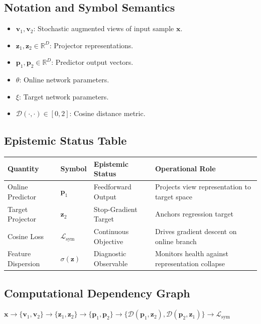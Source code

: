 \documentclass[11pt,a4paper]{article}
\theoremstyle{definition}
\begin{document}
\subsection{Notation and Symbol Semantics}
\begin{itemize}
    \item $\mathbf{v}_1, \mathbf{v}_2$: Stochastic augmented views of input sample $\mathbf{x}$.
    \item $\mathbf{z}_1, \mathbf{z}_2 \in \mathbb{R}^D$: Projector representations.
    \item $\mathbf{p}_1, \mathbf{p}_2 \in \mathbb{R}^D$: Predictor output vectors.
    \item $\theta$: Online network parameters.
    \item $\xi$: Target network parameters.
    \item $\mathcal{D}(\cdot, \cdot) \in [0, 2]$: Cosine distance metric.
\end{itemize}

\subsection{Epistemic Status Table}
\begin{table}[h]
\centering
\small
\begin{tabular}{@{}llll@{}}
\toprule
\textbf{Quantity} & \textbf{Symbol} & \textbf{Epistemic Status} & \textbf{Operational Role} \\
\midrule
Online Predictor & $\mathbf{p}_1$ & Feedforward Output & Projects view representation to target space \\
Target Projector & $\mathbf{z}_2$ & Stop-Gradient Target & Anchors regression target \\
Cosine Loss & $\mathcal{L}_{\text{sym}}$ & Continuous Objective & Drives gradient descent on online branch \\
Feature Dispersion & $\sigma(\mathbf{z})$ & Diagnostic Observable & Monitors health against representation collapse \\
\bottomrule
\end{tabular}
\end{table}

\subsection{Computational Dependency Graph}
{\centering
$\mathbf{x} \longrightarrow \{\mathbf{v}_1, \mathbf{v}_2\} \longrightarrow \{\mathbf{z}_1, \mathbf{z}_2\} \longrightarrow \{\mathbf{p}_1, \mathbf{p}_2\} \longrightarrow \{\mathcal{D}(\mathbf{p}_1, \mathbf{z}_2), \mathcal{D}(\mathbf{p}_2, \mathbf{z}_1)\} \longrightarrow \mathcal{L}_{\text{sym}}$
\par}
\end{document}

